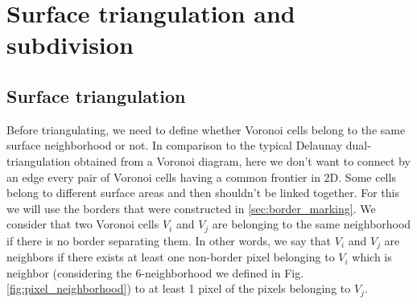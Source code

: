 
\section{Surface triangulation and subdivision}
\label{sec:surface_triangulation_subdivision}

\subsection{Surface triangulation}

Before triangulating, we need to define whether Voronoi cells belong to the same surface neighborhood or not. 
In comparison to the typical Delaunay dual-triangulation obtained from a Voronoi diagram, here we don't want to connect by an edge every pair of Voronoi cells having a common frontier in 2D. Some cells belong to different surface areas and then shouldn't be linked together.
For this we will use the borders that were constructed in \ref{sec:border_marking}.
We consider that two Voronoi cells $V_i$ and $V_j$ are belonging to the same neighborhood if there is no border separating them. In other words, we say that $V_i$ and $V_j$ are neighbors if there exists at least one non-border pixel belonging to $V_i$ which is neighbor (considering the 6-neighborhood we defined in Fig. \ref{fig:pixel_neighborhood}) to at least 1 pixel of the pixels belonging to $V_j$.

